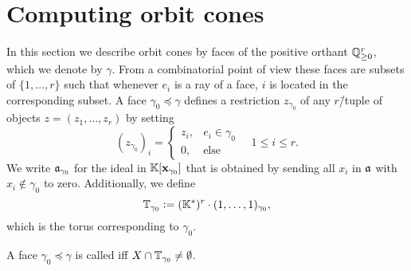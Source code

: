 \section{Computing orbit cones}

In this section we describe orbit cones by faces of the positive orthant $\mathbb{Q}_{\geq 0}^r$, which we denote by $\gamma$.
%
From a combinatorial point of view these faces are subsets of $\{1,\dots,r\}$ such that whenever $e_i$ is a ray of a face, $i$ is located in the corresponding subset. A face $\gamma_0 \preceq \gamma$ defines a restriction $z_{\gamma_0}$ of any $r$\=/tuple of objects $z=(z_1,\dots,z_r)$ by setting
$$(z_{\gamma_0})_i =
\begin{cases}
z_i, & e_i\in\gamma_0 \\
0, & \text{else}
\end{cases}\quad 1\leq i \leq r.$$
We write $\mathfrak{a}_{\gamma_0}$ for the ideal in $\mathbb{K}[\mathbf{x}_{\gamma_0}]$ that is obtained by sending all $x_i$ in $\mathfrak{a}$ with $x_i\notin\gamma_0$ to zero.
%
Additionally, we define
$$\mathbb{T}_{\gamma_0} \mathrel{\mathop:}= (\mathbb{K}^*)^r \cdot (1,\dots,1)_{\gamma_0},$$
which is the torus corresponding to $\gamma_0$.
%

\begin{defi}[\aface]
	A face $\gamma_0\preceq\gamma$ is called \emph{\aface{}} iff $X\cap \mathbb{T}_{\gamma_0} \neq \emptyset$.
\end{defi}

